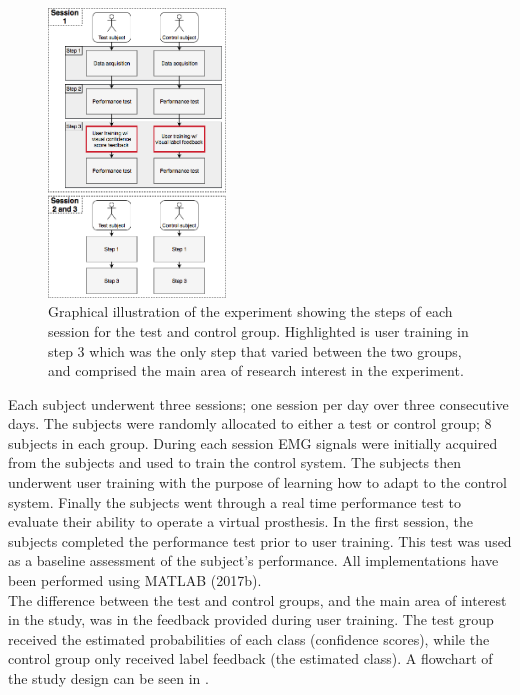 \vspace{0.1cm}

\begin{figure}[H]                                         
	\includegraphics[width=0.42\textwidth]{figures/Paper/Study_design}  
	\caption{Graphical illustration of the experiment showing the steps of each session for the test and control group. Highlighted is user training in step 3 which was the only step that varied between the two groups, and comprised the main area of research interest in the experiment.}
	\label{fig:P:std} 
\end{figure}
\vspace{-0.7cm}
Each subject underwent three sessions; one session per day over three consecutive days. The subjects were randomly allocated to either a test or control group; 8 subjects in each group. During each session EMG signals were initially acquired from the subjects and used to train the control system. The subjects then underwent user training with the purpose of learning how to adapt to the control system. Finally the subjects went through a real time performance test to evaluate their ability to operate a virtual prosthesis. In the first session, the subjects completed the performance test prior to user training. This test was used as a baseline assessment of the subject's performance. All implementations have been performed using MATLAB (2017b). \\
The difference between the test and control groups, and the main area of interest in the study, was in the feedback provided during user training. The test group received the estimated probabilities of each class (confidence scores), while the control group only received label feedback (the estimated class). A flowchart of the study design can be seen in .


